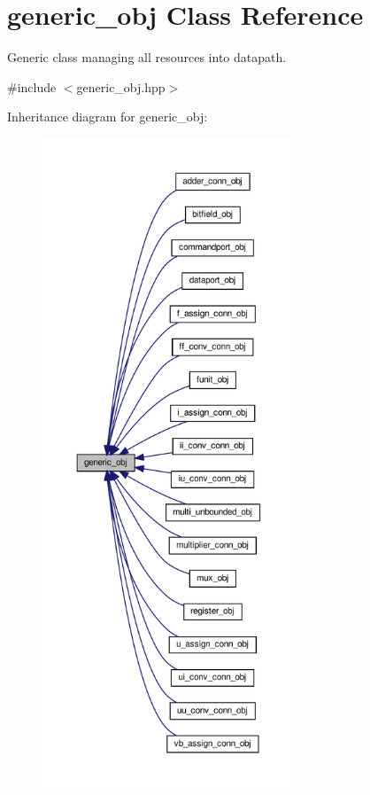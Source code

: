 \hypertarget{classgeneric__obj}{}\section{generic\+\_\+obj Class Reference}
\label{classgeneric__obj}


Generic class managing all resources into datapath.  




{\ttfamily \#include $<$generic\+\_\+obj.\+hpp$>$}



Inheritance diagram for generic\+\_\+obj\+:
\nopagebreak
\begin{figure}[H]
\begin{center}
\leavevmode
\includegraphics[height=550pt]{d9/dba/classgeneric__obj__inherit__graph}
\end{center}
\end{figure}


